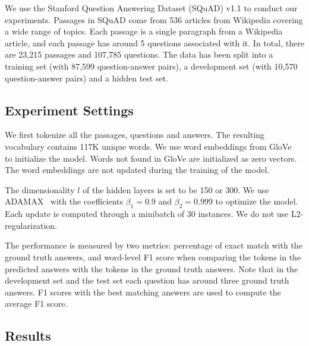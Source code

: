 \documentclass{article} \usepackage{iclr2017_conference,times}
\begin{document}
We use the Stanford Question Answering Dataset (SQuAD) v1.1 to conduct our experiments.
Passages in SQuAD come from 536 articles from Wikipedia covering a wide range of topics.
Each passage is a single paragraph from a Wikipedia article, and each passage has around 5 questions associated with it.
In total, there are 23,215 passages and 107,785 questions.
The data has been split into a training set (with 87,599 question-answer pairs), a development set (with 10,570 question-answer pairs) and a hidden test set.


\subsection{Experiment Settings}

We first tokenize all the passages, questions and answers.
The resulting vocabulary contains 117K unique words.
We use word embeddings from GloVe~\citep{pennington2014glove:emnlp2014} to initialize the model.
Words not found in GloVe are initialized as zero vectors.
The word embeddings are not updated during the training of the model.

The dimensionality $l$ of the hidden layers is set to be 150 or 300.
We use ADAMAX~\citep{kingma2014adam:iclr2015} with the coefficients $\beta_1=0.9$ and $\beta_2=0.999$ to optimize the model.
Each update is computed through a minibatch of 30 instances.
We do not use L2-regularization.


The performance is measured by two metrics: 
percentage of exact match with the ground truth answers, and word-level F1 score when comparing the tokens in the predicted answers with the tokens in the ground truth answers.
Note that in the development set and the test set each question has around three ground truth answers.
F1 scores with the best matching answers are used to compute the average F1 score.

\subsection{Results}
\end{document}
